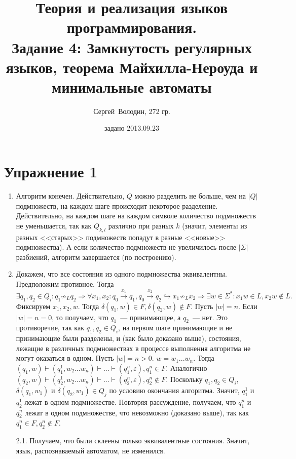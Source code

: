 \documentclass[a4paper]{article}
\title{Теория и реализация языков программирования.\\Задание 4: Замкнутость регулярных языков, теорема Майхилла-Нероуда и минимальные автоматы}
\date{задано 2013.09.23}
\author{Сергей~Володин, 272 гр.}
\begin{document}
\maketitle
\section*{Упражнение 1}
\begin{enumerate}[1.]
\item Алгоритм конечен. Действительно, $Q$ можно разделить не больше, чем на $|Q|$ подмножеств, на каждом шаге происходит некоторое разделение.\newline
Действительно, на каждом шаге на каждом символе количество подмножеств не уменьшается, так как $Q_{k,l}$ различно при разных $k$ (значит, элементы из разных <<старых>> подмножеств попадут в разные <<новые>> подмножества).\newline
А если количество подмножеств не увеличилось после $|\Sigma|$ разбиений, алгоритм завершается (по построению).
\item Докажем, что все состояния из одного подмножества эквивалентны. Предположим противное. Тогда $$\exists q_1,q_2\in Q_i \colon q_1\not\sim_L q_2\Rightarrow \forall x_1,x_2\colon q_0\overset{x_1}{\longrightarrow}q_1, q_0\overset{x_2}{\longrightarrow}q_2\hookrightarrow x_1\not\sim_L x_2\Rightarrow \exists w\in\Sigma^*\colon x_1w\in L, x_2w\notin L.$$ Фиксируем $x_1,x_2,w$. Тогда $\delta(q_1,w)\in F, \delta(q_2,w)\notin F$. Пусть $|w|=n$.\newline
Если $|w|=n=0$, то получаем, что $q_1$~--- принимающее, а $q_2$~--- нет. Это противоречие, так как $q_1,q_2\in Q_i$, на первом шаге принимающие и не принимающие были разделены, и (как было доказано выше), состояния, лежащие в различных подмножествах в процессе выполнения алгоритма не могут оказаться в одном.\newline
Пусть $|w|=n>0$. $w=w_1...w_n$. Тогда $(q_1,w)\vdash(q^1_1,w_2...w_n)\vdash...\vdash(q^n_1,\varepsilon),q^n_1\in F$. Аналогично $(q_2,w)\vdash(q^1_2,w_2...w_n)\vdash...\vdash(q^n_2,\varepsilon),q^n_2\notin F$. Поскольку $q_1,q_2\in Q_i$, $\delta(q_1,w_1)$ и $\delta(q_2,w_1)\in Q_j$ по условию окончания алгоритма. Значит, $q^1_1$ и $q^1_2$ лежат в одном подмножестве. Повторяя рассуждение, получаем, что $q^n_1$ и $q^n_2$ лежат в одном подмножестве, что невозможно (доказано выше), так как $q^n_1\in F,q^n_2\notin F$.
\item[2.1.] Получаем, что были склеены только эквивалентные состояния. Значит, язык, распознаваемый автоматом, не изменился.

\end{enumerate}
\end{document}
